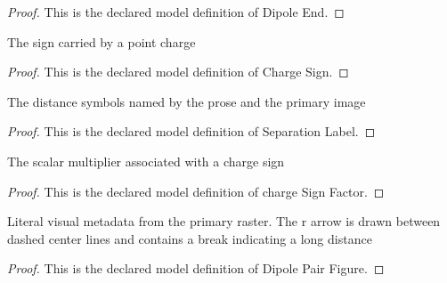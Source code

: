 \begin{proof}
  This is the declared model definition of Dipole End.
\end{proof}
\begin{definition}
  \label{def:physics:phyx-mini-0522:phyxminiproblems-problemphyxmini0522-chargesign}
  The sign carried by a point charge
\end{definition}
\begin{proof}
  This is the declared model definition of Charge Sign.
\end{proof}
\begin{definition}
  \label{def:physics:phyx-mini-0522:phyxminiproblems-problemphyxmini0522-separationlabel}
  The distance symbols named by the prose and the primary image
\end{definition}
\begin{proof}
  This is the declared model definition of Separation Label.
\end{proof}
\begin{definition}
  \label{def:physics:phyx-mini-0522:phyxminiproblems-problemphyxmini0522-chargesignfactor}
  The scalar multiplier associated with a charge sign
\end{definition}
\begin{proof}
  This is the declared model definition of charge Sign Factor.
\end{proof}
\begin{definition}
  \label{def:physics:phyx-mini-0522:phyxminiproblems-problemphyxmini0522-dipolepairfigure}
  Literal visual metadata from the primary raster. The r arrow is drawn between dashed center lines and contains a break indicating a long distance
\end{definition}
\begin{proof}
  This is the declared model definition of Dipole Pair Figure.
\end{proof}

